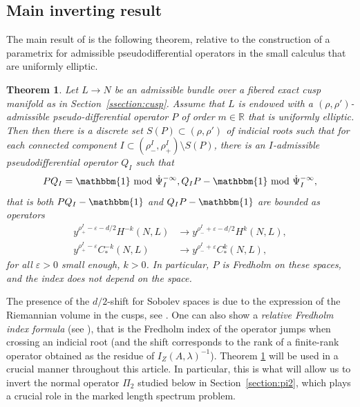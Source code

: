 \documentclass[10pt]{amsart}
\newcommand{\R}{\mathbb{R}}
\newcommand{\eps}{\varepsilon}
\theoremstyle{plain}
\newtheorem{theorem}{Theorem}[section]
\theoremstyle{definition}
\begin{document}
\subsection{Main inverting result}

The main result of \cite[Th.\,3]{Bonthonneau-Lefeuvre-19-1} is the following theorem, relative to the construction of a parametrix for admissible pseudodifferential operators in the small calculus that are uniformly elliptic.

\begin{theorem}\label{theorem:parametrix-compact}
Let $L \to N$ be an admissible bundle over a fibered exact cusp manifold as in Section~\ref{ssection:cusp}. Assume that $L$ is endowed with a $(\rho,\rho')$-admissible pseudo-differential operator $P$ of order $m \in \R$ that is uniformly elliptic. Then then there is a discrete set $S(P) \subset (\rho,\rho')$ of indicial roots such that for each connected component $I \subset (\rho_-^I,\rho_+^I) \setminus S(P)$, there is an $I$-admissible pseudodifferential operator $Q_I$ such that
\[
P Q_I = \mathbbm{1} \text{ mod } \dot{\Psi}_I^{-\infty}, Q_I P - \mathbbm{1} \text{ mod } \dot{\Psi}_I^{-\infty},
\]
that is both $P Q_I - \mathbbm{1}$ and $Q_IP-\mathbbm{1}$ are bounded as operators
\[
\begin{split}
y^{\rho_+^I-\eps-d/2}H^{-k}(N,L) &\to y^{\rho_-^I+\eps-d/2}H^{k}(N,L), \\
y^{\rho_+^I-\eps}C^{-k}_*(N,L) &\to y^{\rho_-^I+\eps}C^{k}_*(N,L),
\end{split}
\]
for all $\eps > 0$ small enough, $k > 0$. In particular, $P$ is Fredholm on these spaces, and the index does not depend on the space.
\end{theorem}

The presence of the $d/2$-shift for Sobolev spaces is due to the expression of the Riemannian volume in the cusps, see \cite[Lem.\,4.4]{Bonthonneau-Lefeuvre-19-1}. One can also show a \emph{relative Fredholm index formula} (see \cite[\S 4.2.5]{Bonthonneau-Lefeuvre-19-1}), that is the Fredholm index of the operator jumps when crossing an indicial root (and the shift corresponds to the rank of a finite-rank operator obtained as the residue of $I_Z(A,\lambda)^{-1}$). Theorem \ref{theorem:parametrix-compact} will be used in a crucial manner throughout this article. In particular, this is what will allow us to invert the normal operator $\Pi_2$ studied below in Section~\ref{section:pi2}, which plays a crucial role in the marked length spectrum problem.
\end{document}
